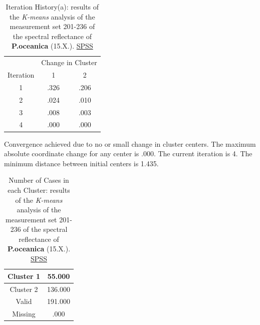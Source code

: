 \documentclass[10pt, a4paper]{article}
\begin{document}
\begin{appendices}
\begin{table}[htbp]
	\caption{Iteration History(a): results of the \textit{K-means} analysis of the measurement set 201-236 of the spectral reflectance of \textbf{P.oceanica} (15.X.).  \href{http://www.spss.com/}{SPSS}}
	\begin{center}
	\begin{tabular}{|c|c|c|}
		\hline\hline
		& \multicolumn{2}{|c|}{Change in Cluster} \\
		 Iteration & 1 & 2 \\ \hline\hline
		1 &	.326 &	.206 \\ \hline
		2 &	.024 & 	.010 \\ \hline
		3 &	.008 &	.003 \\ \hline
		4 &	.000 &	.000 \\ \hline
	\end{tabular}
	\end{center}
	Convergence achieved due to no or small change in cluster centers. The maximum absolute coordinate change for any center is .000. The current iteration is 4. The minimum distance between initial centers is 1.435.
\label{tab:21}
\end{table}

\begin{table}[H]
	\caption{Number of Cases in each Cluster: results of the \textit{K-means} analysis of the measurement set 201-236 of the spectral reflectance of \textbf{P.oceanica} (15.X.).  \href{http://www.spss.com/}{SPSS}}
		\begin{center}
		\begin{tabular}{|c|c|}
		\hline\hline
			Cluster 1 & 55.000 \\ \hline
			Cluster 2 & 136.000 \\ \hline
			Valid &	191.000 \\ \hline
			Missing & .000 \\ \hline
		\end{tabular}
		\end{center}
	\label{tab:22}
\end{table}
\pagebreak


\end{appendices}
\end{document}
